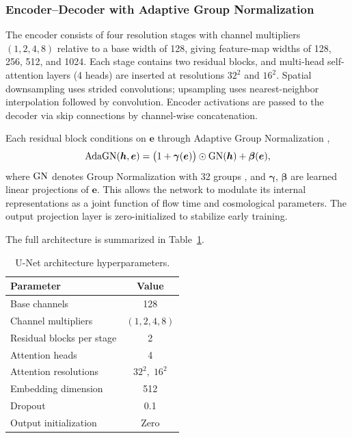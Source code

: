 \documentclass[linenumbers,trackchanges, twocolumn]{aastex701}
\begin{document}
\subsubsection{Encoder--Decoder with Adaptive Group Normalization}

The encoder consists of four resolution stages with channel
multipliers $(1,2,4,8)$ relative to a base width of 128, giving
feature-map widths of 128, 256, 512, and 1024. Each stage contains
two residual blocks, and multi-head self-attention layers (4 heads) are
inserted at resolutions $32^2$ and $16^2$. Spatial downsampling uses
strided convolutions; upsampling uses nearest-neighbor interpolation
followed by convolution. Encoder activations are passed to the decoder
via skip connections by channel-wise concatenation.

Each residual block conditions on $\bm{e}$ through Adaptive Group
Normalization \citep{dhariwal2021diffusion},
\begin{equation}
    {\rm AdaGN}(\bm{h},\bm{e})
    =
    \bigl(1 + \boldsymbol{\gamma}(\bm{e})\bigr)
    \odot {\rm GN}(\bm{h})
    + \boldsymbol{\beta}(\bm{e}),
    \label{eq:adagn}
\end{equation}
where ${\rm GN}$ denotes Group Normalization with 32 groups
\citep{wu2018groupnorm}, and $\boldsymbol{\gamma}$,
$\boldsymbol{\beta}$ are learned linear projections of $\bm{e}$.
This allows the network to modulate its internal representations as a
joint function of flow time and cosmological parameters. The output
projection layer is zero-initialized to stabilize early training.

The full architecture is summarized in Table~\ref{tab:architecture}.

\begin{table}
\centering
\caption{U-Net architecture hyperparameters.}
\label{tab:architecture}
\begin{tabular}{lc}
\hline
Parameter & Value \\
\hline
Base channels              & 128 \\
Channel multipliers        & $(1, 2, 4, 8)$ \\
Residual blocks per stage  & 2 \\
Attention heads            & 4 \\
Attention resolutions      & $32^2,\;16^2$ \\
Embedding dimension        & 512 \\
Dropout                    & 0.1 \\
Output initialization      & Zero \\
\hline
\end{tabular}
\end{table}
\end{document}
